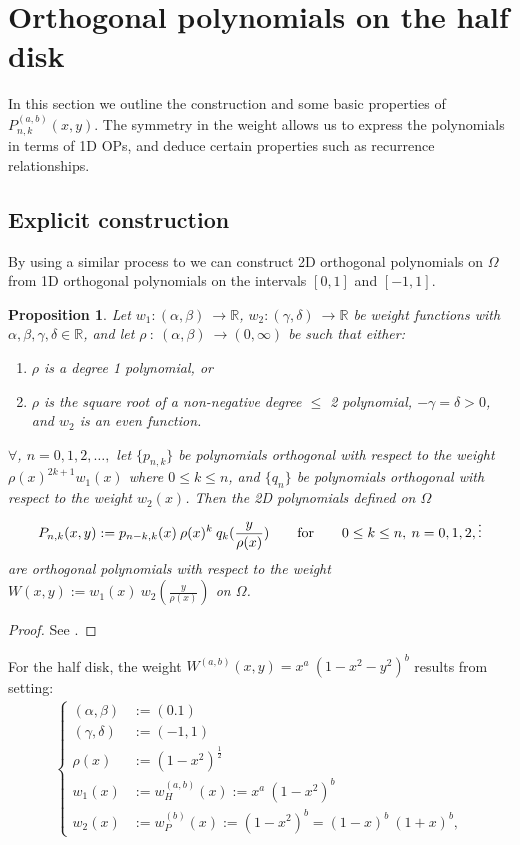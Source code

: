 \documentclass[11pt, oneside]{article}   	%
\newcommand{\half}{\frac{1}{2}}
\newcommand{\R}{\mathbb{R}}
\newcommand{\Pnk}{P_{n,k}}
\newtheorem{proposition}{Proposition}
\begin{document}
\section{Orthogonal polynomials on the half disk}\label{Section:OPs}

In this section we outline the construction and some basic properties of $P_{n,k}^{(a,b)}(x,y)$. The symmetry in the weight allows us to express the polynomials in terms of 1D OPs, and deduce certain properties such as recurrence relationships. 

\subsection{Explicit construction}


By using a similar process to \cite[p55--56]{dunkl2014orthogonal} we can construct 2D orthogonal polynomials on $\Omega$ from 1D orthogonal polynomials on the intervals \([0,1]\) and \([-1,1]\).

\begin{proposition}
Let \(w_1 : (\alpha,\beta) \: \to \R\), \(w_2 : (\gamma,\delta) \: \to \R\) be weight functions with \(\alpha,\beta,\gamma,\delta \in \R\), and let \(\rho \: : \: (\alpha,\beta) \: \to (0,\infty)\) be such that either:
\begin{enumerate}
\item  \(\rho\) is a degree 1 polynomial, or 
\item \(\rho\) is the square root of a non-negative degree \(\le\) 2 polynomial, \(-\gamma = \delta > 0\), and \(w_2\) is an even function.
\end{enumerate}
$\forall$, $n = 0,1,2,\dots, $ let $\{p_{n,k}\}$ be polynomials orthogonal with respect to the weight $\rho(x)^{2k+1} w_1(x)$ where $0 \le k \le n$, and $\{q_{n}\}$ be polynomials orthogonal with respect to the weight $w_2(x)$. Then the 2D polynomials defined on $\Omega$
$$
\Pnk(x,y) := p_{n-k,k}(x) \: \rho(x)^k \: q_k(\frac{y}{\rho(x)}) \qquad\hbox{for} \qquad 0 \le k \le n, \: n = 0,1,2,\dots
$$
are orthogonal polynomials with respect to the weight \(W(x,y) := w_1(x) \: w_2(\frac{y}{\rho(x)}) \) on $\Omega$. 
\end{proposition}
\begin{proof}
See \cite[p55--56]{dunkl2014orthogonal}.
\end{proof}

For the half disk, the weight $W^{(a,b)}(x,y) = x^a \: (1-x^2-y^2)^b$ results from setting:
\begin{align}
\begin{cases}
(\alpha,\beta) &:= (0.1) \\
(\gamma,\delta) &:= (-1,1) \\
\rho(x) &:= (1-x^2)^{\half} \\
w_1(x) &:= w_H^{(a,b)}(x) := x^a \: (1-x^2)^b \\
w_2(x) &:= w_P^{(b)}(x) := (1-x^2)^b = (1-x)^b \: (1+x)^b,
\end{cases}
\end{align}
\end{document}
